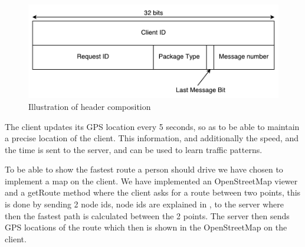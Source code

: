 \begin{figure}[h!]
  \centering
    \includegraphics[width=1\textwidth]{figures/bytesclientserver.pdf}
    \caption{Illustration of header composition}
    \label{fig:bytesclientserver}
\end{figure}

The client updates its GPS location every 5 seconds, so as to be able to maintain a precise location of the client. This information, and additionally the speed, and the time is sent to the server, and can be used to learn traffic patterns.

To be able to show the fastest route a person should drive we have chosen to implement a map on the client. We have implemented an OpenStreetMap viewer and a getRoute method where the client asks for a route between two points, this is done by sending 2 node ids, node ids are explained in , to the server where then the fastest path is calculated between the 2 points. The server then sends GPS locations of the route which then is shown in the OpenStreetMap on the client.